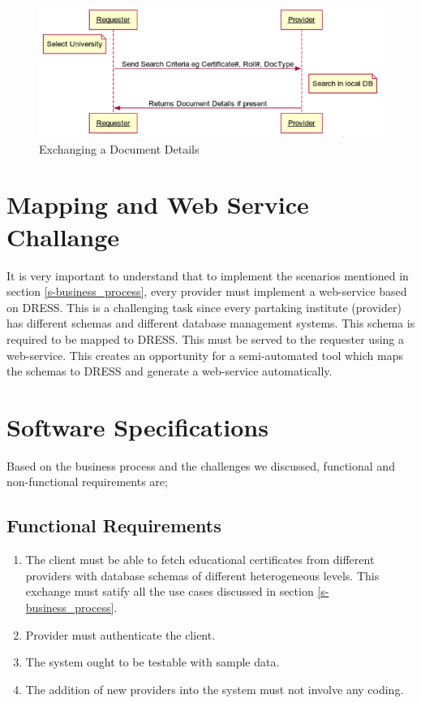 \documentclass[12pt,a4paper,oneside]{book}
\begin{document}
\begin{figure}[!htp]
  \centering
  \includegraphics[width=14cm]{sq_exchange_doc.png}
  \caption{Exchanging a Document Details}
  \label{fig:sq_exchange_doc}
\end{figure}

\section{Mapping and Web Service Challange}

It is very important to understand that to implement the scenarios mentioned in section \ref{s-business_process}, every provider must implement a web-service based on DRESS. This is a challenging task since every partaking institute (provider) has different schemas and different database management systems. This schema is required to be mapped to DRESS. This must be served to the requester using a web-service. This creates an opportunity for a semi-automated tool which maps the schemas to DRESS and generate a web-service automatically.

\section{Software Specifications}
Based on the business process and the challenges we discussed, functional and non-functional requirements are;

    \subsection{Functional Requirements}
    
    \begin{enumerate}

		\item The client must be able to fetch educational certificates from different providers with database schemas of different heterogeneous levels. This exchange must satify all the use cases discussed in section \ref{s-business_process}.

		\item Provider must authenticate the client.
	
		\item The system ought to be testable with sample data.	
		
		\item The addition of new providers into the system must not involve any coding.

	\end{enumerate} 
\end{document}
